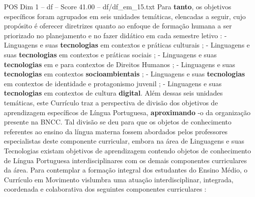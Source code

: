 \begin{textsample}{POS Dim 1 – df – Score 41.00 – df/df\_em\_15.txt}
Para \textbf{tanto}, os objetivos específicos foram agrupados em seis unidades temáticas, elencadas a seguir, cujo propósito é oferecer diretrizes quanto ao enfoque de formação humana a ser priorizado no planejamento e no fazer didático em cada semestre letivo : - Linguagens e suas \textbf{tecnologias} em contextos e práticas culturais ; - Linguagens e suas \textbf{tecnologias} em contextos e práticas sociais ; - Linguagens e suas \textbf{tecnologias} em e para contextos de Direitos Humanos ; - Linguagens e suas \textbf{tecnologias} em contextos \textbf{socioambientais} ; - Linguagens e suas \textbf{tecnologias} em contextos de identidade e protagonismo juvenil ; - Linguagens e suas \textbf{tecnologias} em contextos de cultura \textbf{digital}.
Além dessas seis unidades temáticas, este Currículo traz a perspectiva de divisão dos objetivos de aprendizagem específicos de Língua Portuguesa, \textbf{aproximando} -o da organização presente na BNCC.
Tal divisão se deu para que os objetos de conhecimento referentes ao ensino da língua materna fossem abordados pelos professores especialistas deste componente curricular, embora na área de Linguagens e suas Tecnologias existam objetivos de aprendizagem contendo objetos de conhecimento de Língua Portuguesa interdisciplinares com os demais componentes curriculares da área.
Para contemplar a formação integral dos estudantes do Ensino Médio, o Currículo em Movimento vislumbra uma atuação interdisciplinar, integrada, coordenada e colaborativa dos seguintes componentes curriculares :

\end{textsample}

